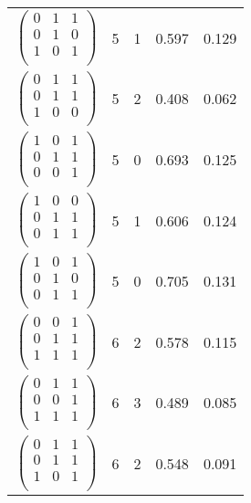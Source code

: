 \begin{longtable}{ c || c | c | c | c }
$\begin{pmatrix}
0 & 1 & 1\\
0 & 1 & 0\\
1 & 0 & 1\\
\end{pmatrix}$ & 5 & 1 & 0.597 & 0.129\\
$\begin{pmatrix}
0 & 1 & 1\\
0 & 1 & 1\\
1 & 0 & 0\\
\end{pmatrix}$ & 5 & 2 & 0.408 & 0.062\\
$\begin{pmatrix}
1 & 0 & 1\\
0 & 1 & 1\\
0 & 0 & 1\\
\end{pmatrix}$ & 5 & 0 & 0.693 & 0.125\\
$\begin{pmatrix}
1 & 0 & 0\\
0 & 1 & 1\\
0 & 1 & 1\\
\end{pmatrix}$ & 5 & 1 & 0.606 & 0.124\\
$\begin{pmatrix}
1 & 0 & 1\\
0 & 1 & 0\\
0 & 1 & 1\\
\end{pmatrix}$ & 5 & 0 & 0.705 & 0.131\\
$\begin{pmatrix}
0 & 0 & 1\\
0 & 1 & 1\\
1 & 1 & 1\\
\end{pmatrix}$ & 6 & 2 & 0.578 & 0.115\\
$\begin{pmatrix}
0 & 1 & 1\\
0 & 0 & 1\\
1 & 1 & 1\\
\end{pmatrix}$ & 6 & 3 & 0.489 & 0.085\\
$\begin{pmatrix}
0 & 1 & 1\\
0 & 1 & 1\\
1 & 0 & 1\\
\end{pmatrix}$ & 6 & 2 & 0.548 & 0.091\\

\end{longtable}
